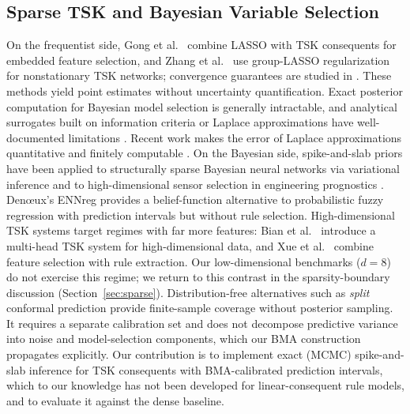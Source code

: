 \documentclass[review,1p,times]{elsarticle}
\begin{document}
\subsection{Sparse TSK and Bayesian Variable Selection}

On the frequentist side, Gong et al.\ \cite{kbs2024embedded} combine LASSO with TSK consequents for embedded feature selection, and Zhang et al.\ \cite{zhang2023sparse} use group-LASSO regularization for nonstationary TSK networks; convergence guarantees are studied in \cite{neuralnet2024sparsetsk}. These methods yield point estimates without uncertainty quantification.
Exact posterior computation for Bayesian model selection is generally intractable, and analytical surrogates built on information criteria or Laplace approximations have well-documented limitations \cite{gelfand1994bayesian,chipman2001practical}.
Recent work makes the error of Laplace approximations quantitative and finitely computable \cite{kasprzak2025laplace}. On the Bayesian side, spike-and-slab priors \cite{mitchell1988bayesian,george1993variable,ishwaran2005spike} have been applied to structurally sparse Bayesian neural networks via variational inference \cite{jantre2025spike} and to high-dimensional sensor selection in engineering prognostics \cite{huh2025spike}. Den{\oe}ux's ENNreg \cite{denoeux2023ennreg} provides a belief-function alternative to probabilistic fuzzy regression with prediction intervals but without rule selection. High-dimensional TSK systems target regimes with far more features: Bian et al.\ \cite{bian2025mhtsk} introduce a multi-head TSK system for high-dimensional data, and Xue et al.\ \cite{xue2023dgaletsk} combine feature selection with rule extraction. Our low-dimensional benchmarks ($d=8$) do not exercise this regime; we return to this contrast in the sparsity-boundary discussion (Section~\ref{sec:sparse}).
Distribution-free alternatives such as \emph{split} conformal prediction \cite{vovk2005algorithmic,lei2018distributionfree} provide finite-sample coverage without posterior sampling.
It requires a separate calibration set and does not decompose predictive variance into noise and model-selection components, which our BMA construction propagates explicitly. Our contribution is to implement exact (MCMC) spike-and-slab inference for TSK consequents with BMA-calibrated prediction intervals, which to our knowledge has not been developed for linear-consequent rule models, and to evaluate it against the dense baseline.
\end{document}
